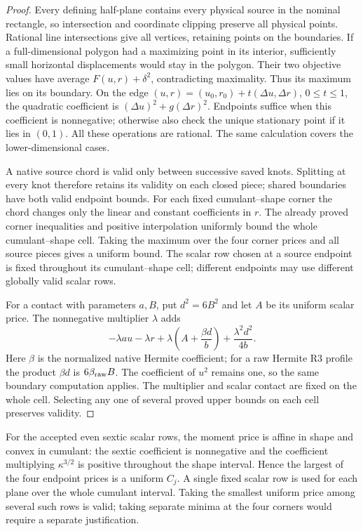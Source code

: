 \begin{proof}
Every defining half-plane contains every physical source in the nominal
rectangle, so intersection and coordinate clipping preserve all physical
points. Rational line intersections give all vertices, retaining points
on the boundaries. If a full-dimensional polygon had a maximizing point
in its interior, sufficiently small horizontal displacements would stay
in the polygon. Their two objective values have average
$F(u,r)+\delta^2$, contradicting maximality. Thus its maximum lies on its
boundary. On the edge $(u,r)=(u_0,r_0)+t(\Delta u,\Delta r)$,
$0\le t\le1$, the quadratic coefficient is
$(\Delta u)^2+g(\Delta r)^2$. Endpoints suffice when this coefficient is
nonnegative; otherwise also check the unique stationary point if it lies
in $(0,1)$. All these operations are rational. The same calculation covers
the lower-dimensional cases.

A native source chord is valid only between successive saved knots.
Splitting at every knot therefore retains its validity on each closed
piece; shared boundaries have both valid endpoint bounds. For each fixed
cumulant--shape corner the chord changes only the linear and constant
coefficients in $r$. The already proved corner inequalities and positive
interpolation uniformly bound the whole cumulant--shape cell. Taking the
maximum over the four corner prices and all source pieces gives a uniform
bound. The scalar row chosen at a source endpoint is fixed throughout its
cumulant--shape cell; different endpoints may use different globally
valid scalar rows.

For a contact with parameters $a,B$, put $d^2=6B^2$ and let $A$ be its
uniform scalar price. The nonnegative multiplier $\lambda$ adds
\[
 -\lambda a u-\lambda r+
 \lambda\left(A+\frac{\beta d}{b}\right)
 +\frac{\lambda^2d^2}{4b}.
\]
Here $\beta$ is the normalized native Hermite coefficient; for a raw
Hermite R3 profile the product $\beta d$ is $6\beta_{\rm raw}B$.
The coefficient of $u^2$ remains one, so the same boundary computation
applies. The multiplier and scalar contact are fixed on the whole
cell. Selecting any one of several proved upper bounds on each cell
preserves validity.
\end{proof}

\begin{remark}
For the accepted even sextic scalar rows, the moment price is affine in
shape and convex in cumulant: the sextic coefficient is nonnegative and
the coefficient multiplying $\kappa^{3/2}$ is positive throughout the
shape interval. Hence the largest of the four endpoint prices is a
uniform $C_j$. A single fixed scalar row is used for each plane over the
whole cumulant interval. Taking the smallest uniform price among several
such rows is valid; taking separate minima at the four corners would
require a separate justification.
\end{remark}
